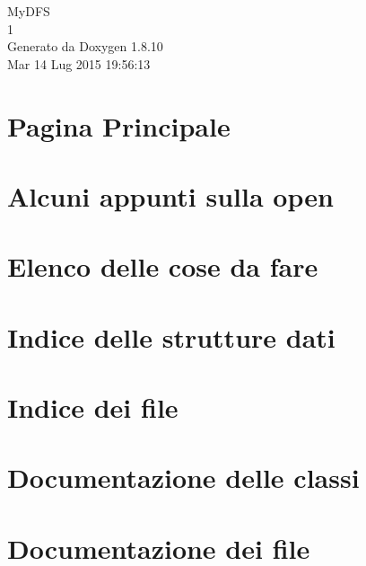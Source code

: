 \documentclass[twoside]{book}
\newcommand{\+}{\discretionary{\mbox{\scriptsize$\hookleftarrow$}}{}{}}
\newcommand{\clearemptydoublepage}{%
  \newpage{\pagestyle{empty}\cleardoublepage}%
}
\begin{document}
\hypersetup{pageanchor=false,
             bookmarks=true,
             bookmarksnumbered=true,
             pdfencoding=unicode
            }
\begin{titlepage}
\vspace*{7cm}
\begin{center}%
{\Large My\+D\+F\+S \\[1ex]\large 1 }\\
\vspace*{1cm}
{\large Generato da Doxygen 1.8.10}\\
\vspace*{0.5cm}
{\small Mar 14 Lug 2015 19:56:13}\\
\end{center}
\end{titlepage}
\clearemptydoublepage
\tableofcontents
\clearemptydoublepage
{}
\hypersetup{pageanchor=true}

\chapter{Pagina Principale}
\label{index}\hypertarget{index}{}
\chapter{Alcuni appunti sulla open}
\label{md_OPE}
\hypertarget{md_OPE}{}

\chapter{Elenco delle cose da fare}
\label{todo}
\hypertarget{todo}{}

\chapter{Indice delle strutture dati}

\chapter{Indice dei file}

\chapter{Documentazione delle classi}


\chapter{Documentazione dei file}

































\backmatter
\newpage
{}
\clearemptydoublepage
{}
\printindex
\end{document}
